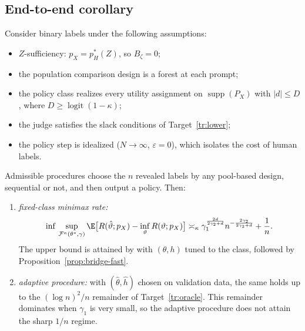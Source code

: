 
\subsection{End-to-end corollary}

\begin{target}
\label{tr:e2e}
Consider binary labels under the following assumptions:
\begin{itemize}
  \item $Z$-sufficiency: $p_X=p_H^{*}(Z)$, so $B_\zeta=0$;
  \item the population comparison design is a forest at each prompt;
  \item the policy class realizes every utility assignment on $\operatorname{supp}(P_X)$ with
        $|d|\le D$, where $D\ge\operatorname{logit}(1-\kappa)$;
  \item the judge satisfies the slack conditions of Target~\ref{tr:lower};
  \item the policy step is idealized ($N\to\infty$, $\varepsilon=0$), which isolates the cost of
        human labels.
\end{itemize}
Admissible procedures choose the $n$ revealed labels by any pool-based design, sequential or not,
and then output a policy. Then:
\begin{enumerate}[label=(\roman*)]
  \item \emph{fixed-class minimax rate:}
        \[
          \inf\,\sup_{\mathcal F^{\kappa}(\theta^{*},\gamma)}\E\bigl[R(\hat\vartheta;p_X)-\inf_\vartheta R(\vartheta;p_X)\bigr]
          \asymp_\kappa\gamma_1^{\frac{2d}{2\gamma_2+d}}n^{-\frac{2\gamma_2}{2\gamma_2+d}}+\frac1n .
        \]
        The upper bound is
        attained by \dfsp{} with $(\theta,h)$ tuned to the class, followed by
        Proposition~\ref{prop:bridge-fast}.
  \item \emph{adaptive procedure:} with $(\hat\theta,\hat h)$ chosen on validation data, the same holds
        up to the $(\log n)^2/n$ remainder of Target~\ref{tr:oracle}. This remainder dominates when
        $\gamma_1$ is very small, so the adaptive procedure does not attain the sharp $1/n$ regime.
\end{enumerate}
\end{target}

